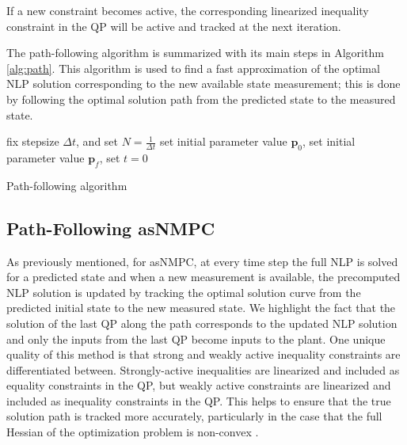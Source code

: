 If a new constraint becomes active, the corresponding linearized inequality constraint in the QP will be active and tracked at the next iteration.
\par
The path-following algorithm is summarized with its main steps in Algorithm \ref{alg:path}.
This algorithm is used to find a fast approximation of the optimal NLP solution corresponding to the new available state measurement; this is done by following the optimal solution path from the predicted state to the measured state.\\
\begin{algorithm}[H]
\SetAlgoLined
{}
 fix stepsize $\Delta t$, and set $N=\frac{1}{\Delta t}$\;
 set initial parameter value $\boldsymbol{p}_0$,\;
 set initial parameter value $\boldsymbol{p}_f$,\;
 set $t=0$\;
 \caption{Path-following algorithm}
\end{algorithm}
\subsection{Path-Following asNMPC}
As previously mentioned, for asNMPC, at every time step the full NLP is solved for a predicted state and when a new measurement is available, the precomputed NLP solution is updated by tracking the optimal solution curve from the predicted initial state to the new measured state.
We highlight the fact that the solution of the last QP along the path corresponds to the updated NLP solution and only the inputs from the last QP become inputs to the plant.
One unique quality of this method is that strong and weakly active inequality constraints are differentiated between.
Strongly-active inequalities are linearized and included as equality constraints in the QP, but weakly active constraints are linearized and included as inequality constraints in the QP.
This helps to ensure that the true solution path is tracked more accurately, particularly in the case that the full Hessian of the optimization problem is non-convex \cite{economics}.

